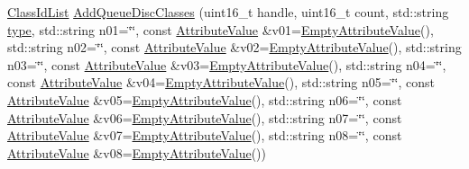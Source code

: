 \begin{DoxyCompactItemize}
\hyperlink{classns3_1_1TrafficControlHelper_aa42018a8e7faa9b7d1d4d2320014ef56}{Class\+Id\+List} \hyperlink{classns3_1_1TrafficControlHelper_a069be368b76a4d89285a9db73df8f20a}{Add\+Queue\+Disc\+Classes} (uint16\+\_\+t handle, uint16\+\_\+t count, std\+::string \hyperlink{visualizer-ideas_8txt_add98db9e15e2a58cf2b57623e7aa893a}{type}, std\+::string n01=\char`\"{}\char`\"{}, const \hyperlink{classns3_1_1AttributeValue}{Attribute\+Value} \&v01=\hyperlink{classns3_1_1EmptyAttributeValue}{Empty\+Attribute\+Value}(), std\+::string n02=\char`\"{}\char`\"{}, const \hyperlink{classns3_1_1AttributeValue}{Attribute\+Value} \&v02=\hyperlink{classns3_1_1EmptyAttributeValue}{Empty\+Attribute\+Value}(), std\+::string n03=\char`\"{}\char`\"{}, const \hyperlink{classns3_1_1AttributeValue}{Attribute\+Value} \&v03=\hyperlink{classns3_1_1EmptyAttributeValue}{Empty\+Attribute\+Value}(), std\+::string n04=\char`\"{}\char`\"{}, const \hyperlink{classns3_1_1AttributeValue}{Attribute\+Value} \&v04=\hyperlink{classns3_1_1EmptyAttributeValue}{Empty\+Attribute\+Value}(), std\+::string n05=\char`\"{}\char`\"{}, const \hyperlink{classns3_1_1AttributeValue}{Attribute\+Value} \&v05=\hyperlink{classns3_1_1EmptyAttributeValue}{Empty\+Attribute\+Value}(), std\+::string n06=\char`\"{}\char`\"{}, const \hyperlink{classns3_1_1AttributeValue}{Attribute\+Value} \&v06=\hyperlink{classns3_1_1EmptyAttributeValue}{Empty\+Attribute\+Value}(), std\+::string n07=\char`\"{}\char`\"{}, const \hyperlink{classns3_1_1AttributeValue}{Attribute\+Value} \&v07=\hyperlink{classns3_1_1EmptyAttributeValue}{Empty\+Attribute\+Value}(), std\+::string n08=\char`\"{}\char`\"{}, const \hyperlink{classns3_1_1AttributeValue}{Attribute\+Value} \&v08=\hyperlink{classns3_1_1EmptyAttributeValue}{Empty\+Attribute\+Value}())
\item 

\end{DoxyCompactItemize}
